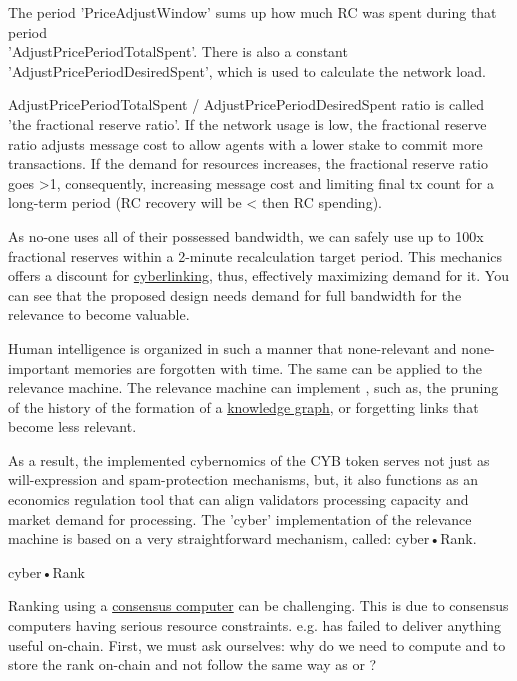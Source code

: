 \documentclass[8pt,oneside]{amsart}
\makeatletter
\newcommand{\linkgreen}[2]{\href{#1}{\color{green}{#2}}}
\renewcommand\subsection{\@startsection{subsection}
                                    {2}{\z@}
                                    {-3.25ex\@plus -1ex \@minus -.2ex}
                                    {0ex \@plus .2ex}
                                    {\play\Large}
                        }
\newcommand{\titleSection}[1]{\subsection{#1}}
\newcommand{\code}[1]{{\PlayBold #1}}
\makeatother
\begin{document}
The period 'PriceAdjustWindow' sums up how much RC was spent during that period\\ 'AdjustPricePeriodTotalSpent'. There is also a constant 'AdjustPricePeriodDesiredSpent', which is used to calculate the network load.

\code{AdjustPricePeriodTotalSpent / AdjustPricePeriodDesiredSpent} ratio is called 'the fractional reserve ratio'. If the network usage is low, the fractional reserve ratio adjusts message cost to allow agents with a lower stake to commit more transactions. If the demand for resources increases, the fractional reserve ratio goes \code{>1}, consequently, increasing message cost and limiting final tx count for a long-term period (RC recovery will be \code{<} then RC spending).

As no-one uses all of their possessed bandwidth, we can safely use up to 100x fractional reserves within a 2-minute recalculation target period. This mechanics offers a discount for {\hyperref[cyberlinks]{cyberlinking}}, thus, effectively maximizing demand for it. You can see that the proposed design needs demand for full bandwidth for the relevance to become valuable.

Human intelligence is organized in such a manner that none-relevant and none-important memories are forgotten with time. The same can be applied to the relevance machine. The relevance machine can implement \linkgreen{https://ipfs.io/ipfs/QmP81EcuNDZHQutvdcDjbQEqiTYUzU315aYaTyrVj6gtJb}{aggressive pruning strategies}, such as, the pruning of the history of the formation of a {\hyperref[knowledge-graph]{knowledge graph}}, or forgetting links that become less relevant.

As a result, the implemented cybernomics of the CYB token serves not just as will-expression and spam-protection mechanisms, but, it also functions as an economics regulation tool that can align validators processing capacity and market demand for processing. The 'cyber' implementation of the relevance machine is based on a very straightforward mechanism, called: cyber•Rank.

\titleSection{cyber•Rank}\label{cyber-rank}

Ranking using a {\hyperref[consensus-computer]{consensus computer}} can be challenging. This is due to consensus computers having serious resource constraints. e.g. \linkgreen{https://ipfs.io/ipfs/QmWTZjDZNbBqcJ5b6VhWGXBQ5EQavKKDteHsdoYqB5CBjh}{Nebulas} has failed to deliver anything useful on-chain. First, we must ask ourselves: why do we need to compute and to store the rank on-chain and not follow the same way as \linkgreen{https://ipfs.io/ipfs/QmZo7eY5UdJYotf3Z9GNVBGLjkCnE1j2fMdW2PgGCmvGPj}{Colony} or \linkgreen{https://ipfs.io/ipfs/QmTrxXp2xhB2zWGxhNoLgsztevqKLwpy5HwKjLjzFa7rnD}{Truebit}?
\end{document}
